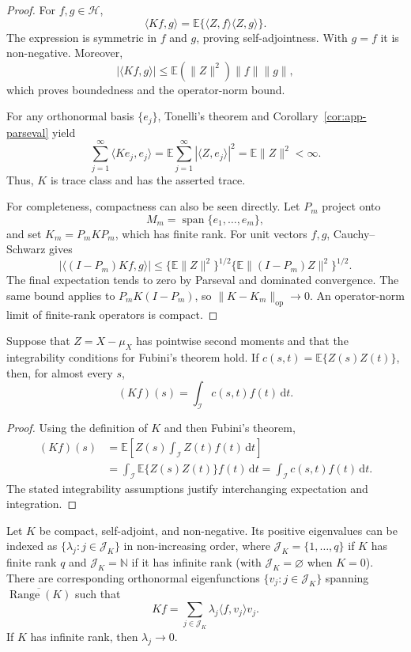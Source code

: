 \begin{proof}
For $f,g\in\mathcal H$,
\[
 \langle Kf,g\rangle
 =\mathbb E\{\langle Z,f\rangle\langle Z,g\rangle\}.
\]
The expression is symmetric in $f$ and $g$, proving self-adjointness.  With
$g=f$ it is non-negative.  Moreover,
\[
 |\langle Kf,g\rangle|
 \leq\mathbb E(\|Z\|^2)\|f\|\|g\|,
\]
which proves boundedness and the operator-norm bound.

For any orthonormal basis $\{e_j\}$, Tonelli's theorem and
Corollary~\ref{cor:app-parseval} yield
\[
 \sum_{j=1}^{\infty}\langle Ke_j,e_j\rangle
 =\mathbb E\sum_{j=1}^{\infty}|\langle Z,e_j\rangle|^2
 =\mathbb E\|Z\|^2<\infty.
\]
Thus, $K$ is trace class and has the asserted trace.

For completeness, compactness can also be seen directly.  Let $P_m$ project
onto
\[
    M_m=\operatorname{span}\{e_1,\ldots,e_m\},
\]
and set $K_m=P_mKP_m$, which has finite rank.  For unit vectors $f,g$,
Cauchy--Schwarz gives
\[
 |\langle (I-P_m)Kf,g\rangle|
 \leq
 \{\mathbb E\|Z\|^2\}^{1/2}
 \{\mathbb E\|(I-P_m)Z\|^2\}^{1/2}.
\]
The final expectation tends to zero by Parseval and dominated convergence.
The same bound applies to $P_mK(I-P_m)$, so
$\|K-K_m\|_{\mathrm{op}}\to0$.  An operator-norm limit of finite-rank
operators is compact.
\end{proof}

\begin{proposition}
\label{prop:app-covariance-kernel}
Suppose that $Z=X-\mu_X$ has pointwise second moments and that the
integrability conditions for Fubini's theorem hold.  If
$c(s,t)=\mathbb E\{Z(s)Z(t)\}$, then, for almost every $s$,
\[
    (Kf)(s)=\int_{\mathcal I}c(s,t)f(t)\,\mathrm dt.
\]
\end{proposition}

\begin{proof}
Using the definition of $K$ and then Fubini's theorem,
\begin{align*}
 (Kf)(s)
 &=\mathbb E\!\left[Z(s)
      \int_{\mathcal I}Z(t)f(t)\,\mathrm dt\right] \\
 &=\int_{\mathcal I}\mathbb E\{Z(s)Z(t)\}f(t)\,\mathrm dt
 =\int_{\mathcal I}c(s,t)f(t)\,\mathrm dt.
\end{align*}
The stated integrability assumptions justify interchanging expectation and
integration.
\end{proof}

\begin{theorem}
\label{thm:app-spectral-representation}
Let $K$ be compact, self-adjoint, and non-negative.  Its positive eigenvalues
can be indexed as $\{\lambda_j:j\in\mathcal J_K\}$ in non-increasing order,
where $\mathcal J_K=\{1,\ldots,q\}$ if $K$ has finite rank $q$ and
$\mathcal J_K=\mathbb N$ if it has infinite rank (with
$\mathcal J_K=\varnothing$ when $K=0$).  There are corresponding
orthonormal eigenfunctions $\{v_j:j\in\mathcal J_K\}$ spanning
$\overline{\operatorname{Range}(K)}$ such that
\[
    Kf=\sum_{j\in\mathcal J_K}
        \lambda_j\langle f,v_j\rangle v_j.
\]
If $K$ has infinite rank, then $\lambda_j\to0$.
\end{theorem}

